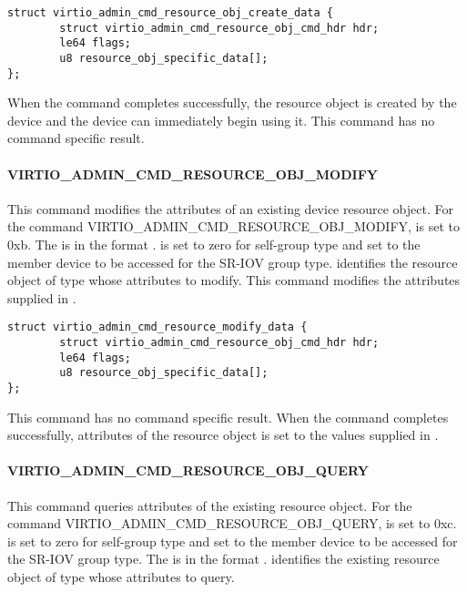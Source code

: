 \begin{lstlisting}
struct virtio_admin_cmd_resource_obj_create_data {
        struct virtio_admin_cmd_resource_obj_cmd_hdr hdr;
        le64 flags;
        u8 resource_obj_specific_data[];
};
\end{lstlisting}

When the command completes successfully, the resource object is created by the
device and the device can immediately begin using it.
This command has no command specific result.

\paragraph{VIRTIO_ADMIN_CMD_RESOURCE_OBJ_MODIFY}
\label{par:Basic Facilities of a Virtio Device / Device groups / Group administration commands / Device resource objects / VIRTIO_ADMIN_CMD_RESOURCE_OBJ_MODIFY}

This command modifies the attributes of an existing device resource object.
For the command VIRTIO_ADMIN_CMD_RESOURCE_OBJ_MODIFY,  is set to 0xb.
The  is in the format
.
 is set to zero for self-group type and set to
the member device to be accessed for the SR-IOV group type.
 identifies the resource object of type  whose attributes
to modify.
This command modifies the attributes supplied in .

\begin{lstlisting}
struct virtio_admin_cmd_resource_modify_data {
        struct virtio_admin_cmd_resource_obj_cmd_hdr hdr;
        le64 flags;
        u8 resource_obj_specific_data[];
};
\end{lstlisting}

This command has no command specific result.
When the command completes successfully, attributes of the resource object is
set to the values supplied in .

\paragraph{VIRTIO_ADMIN_CMD_RESOURCE_OBJ_QUERY}
\label{par:Basic Facilities of a Virtio Device / Device groups / Group administration commands / Device resource objects / VIRTIO_ADMIN_CMD_RESOURCE_OBJ_QUERY}

This command queries attributes of the existing resource object.
For the command VIRTIO_ADMIN_CMD_RESOURCE_OBJ_QUERY,  is set to 0xc.
 is set to zero for self-group type and set to
the member device to be accessed for the SR-IOV group type.
The  is in the format
.
 identifies the existing resource object of type  whose
attributes to query.

